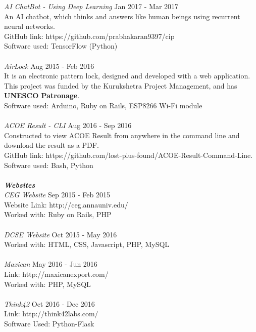 \documentclass[margin, 10pt]{res} %
\begin{document}
\begin{resume}
    {\sl AI ChatBot - Using Deep Learning} \hfill Jan 2017 - Mar 2017 \\
    An AI chatbot, which thinks and answers like human beings using recurrent neural networks. \\
    GitHub link: https://github.com/prabhakaran9397/cip \\
    Software used: TensorFlow (Python) \\
    \\
    {\sl AirLock} \hfill Aug 2015 - Feb 2016 \\
    It is an electronic pattern lock, designed and developed with a web application. This project was funded by the Kurukshetra Project Management, and has \textbf{UNESCO Patronage}.\\ 
    Software used: Arduino, Ruby on Rails, ESP8266 Wi-Fi module \\
    \\
    {\sl ACOE Result - CLI} \hfill Aug 2016 - Sep 2016 \\
    Constructed to view ACOE Result from anywhere in the command line and download the result as a PDF. \\
    GitHub link: https://github.com/lost-plus-found/ACOE-Result-Command-Line.  
    \\ Software used: Bash, Python \\
    \\
    {\sl \textbf{Websites}}\\
    {\sl CEG Website} \hfill Sep 2015 - Feb 2015 \\
    Website Link: http://ceg.annauniv.edu/ \\
    Worked with: Ruby on Rails, PHP \\
    \\ 
    {\sl DCSE Website} \hfill Oct 2015 - May 2016 \\
    Worked with: HTML, CSS, Javascript, PHP, MySQL  \\
    \\
    {\sl Maxican } \hfill May 2016 - Jun 2016 \\
    Link: http://maxicanexport.com/ \\
    Worked with: PHP, MySQL \\
    \\
    {\sl Think42 } \hfill Oct 2016 - Dec 2016 \\
    Link: http://think42labs.com/ \\
    Software Used: Python-Flask \\
    \\


\end{resume}
\end{document}
